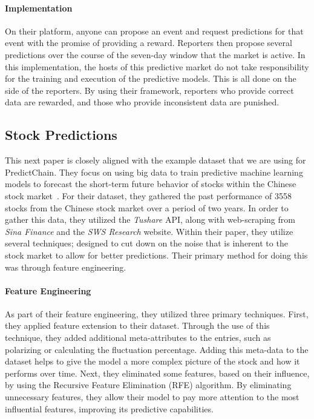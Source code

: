\documentclass{ledger}
\begin{document}
\paragraph{Implementation}
On their platform, anyone can propose an event and request predictions for that event with the promise of providing
a reward.  Reporters then propose several predictions over the course of the seven-day window that the market is
active.  In this implementation, the hosts of this predictive market do not take responsibility for the training
and execution of the predictive models.  This is all done on the side of the reporters.  By using their framework,
reporters who provide correct data are rewarded, and those who provide inconsistent data are punished.

\subsection{Stock Predictions}

This next paper is closely aligned with the example dataset that we are using for PredictChain.  They focus on
using big data to train predictive machine learning models to forecast the short-term future behavior of stocks
within the Chinese stock market~\cite{deepPrediction}.  For their dataset, they gathered the past performance of
3558 stocks from the Chinese stock market over a period of two years.  In order to gather this data, they utilized
the \textit{Tushare} API, along with web-scraping from \textit{Sina Finance} and the \textit{SWS Research} website.
Within their paper, they utilize several techniques; designed to cut down on the noise that is inherent to the stock
market to allow for better predictions.  Their primary method for doing this was through feature engineering.

\paragraph{Feature Engineering}
As part of their feature engineering, they utilized three primary techniques.  First, they applied feature extension
to their dataset.  Through the use of this technique, they added additional meta-attributes to the entries, such
as polarizing or calculating the fluctuation percentage.  Adding this meta-data to the dataset helps to give the model
a more complex picture of the stock and how it performs over time.  Next, they eliminated some features, based on their
influence, by using the Recursive Feature Elimination (RFE) algorithm.  By eliminating unnecessary features, they allow
their model to pay more attention to the most influential features, improving its predictive capabilities.
\end{document}
